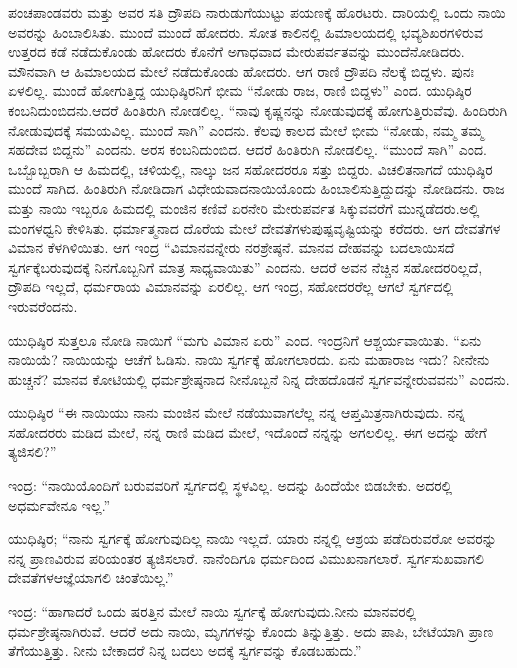 ಪಂಚಪಾಂಡವರು ಮತ್ತು ಅವರ ಸತಿ ದ್ರೌಪದಿ ನಾರುಡುಗೆಯುಟ್ಟು ಪಯಣಕ್ಕೆ ಹೊರಟರು. ದಾರಿಯಲ್ಲಿ ಒಂದು ನಾಯಿ ಅವರನ್ನು ಹಿಂಬಾಲಿಸಿತು. ಮುಂದೆ ಮುಂದೆ ಹೋದರು. ಸೋತ ಕಾಲಿನಲ್ಲಿ ಹಿಮಾಲಯದಲ್ಲಿ ಭವ್ಯಶಿಖರಗಳಿರುವ ಉತ್ತರದ ಕಡೆ ನಡೆದುಕೊಂಡು ಹೋದರು ಕೊನೆಗೆ ಅಗಾಧವಾದ ಮೇರುಪರ್ವತವನ್ನು ಮುಂದೆ\break ನೋಡಿದರು. ಮೌನವಾಗಿ ಆ ಹಿಮಾಲಯದ ಮೇಲೆ ನಡೆದುಕೊಂಡು ಹೋದರು. ಆಗ ರಾಣಿ ದ್ರೌಪದಿ ನೆಲಕ್ಕೆ ಬಿದ್ದಳು. ಪುನಃ ಏಳಲಿಲ್ಲ. ಮುಂದೆ ಹೋಗುತ್ತಿದ್ದ ಯುಧಿಷ್ಠಿರನಿಗೆ ಭೀಮ “ನೋಡು ರಾಜ, ರಾಣಿ ಬಿದ್ದಳು” ಎಂದ. ಯುಧಿಷ್ಠಿರ ಕಂಬನಿದುಂಬಿದನು.\break ಆದರೆ ಹಿಂತಿರುಗಿ ನೋಡಲಿಲ್ಲ. “ನಾವು ಕೃಷ್ಣನನ್ನು ನೋಡುವುದಕ್ಕೆ ಹೋಗುತ್ತಿರುವೆವು. ಹಿಂದಿರುಗಿ ನೋಡುವುದಕ್ಕೆ ಸಮಯವಿಲ್ಲ. ಮುಂದೆ ಸಾಗಿ” ಎಂದನು. ಕೆಲವು ಕಾಲದ ಮೇಲೆ ಭೀಮ “ನೋಡು, ನಮ್ಮ ತಮ್ಮ ಸಹದೇವ ಬಿದ್ದನು” ಎಂದನು. ಅರಸ ಕಂಬನಿದುಂಬಿದ. ಆದರೆ ಹಿಂತಿರುಗಿ ನೋಡಲಿಲ್ಲ. “ಮುಂದೆ ಸಾಗಿ” ಎಂದ. ಒಬ್ಬೊಬ್ಬರಾಗಿ ಆ ಹಿಮದಲ್ಲಿ, ಚಳಿಯಲ್ಲಿ, ನಾಲ್ಕು ಜನ ಸಹೋದರರೂ ಸತ್ತು ಬಿದ್ದರು. ವಿಚಲಿತನಾಗದೆ ಯುಧಿಷ್ಠಿರ ಮುಂದೆ ಸಾಗಿದ. ಹಿಂತಿರುಗಿ ನೋಡಿದಾಗ ವಿಧೇಯವಾದ\break ನಾಯಿಯೊಂದು ಹಿಂಬಾಲಿಸುತ್ತಿದ್ದುದನ್ನು ನೋಡಿದನು. ರಾಜ ಮತ್ತು ನಾಯಿ ಇಬ್ಬರೂ ಹಿಮದಲ್ಲಿ ಮಂಜಿನ ಕಣಿವೆ ಏರನೇರಿ ಮೇರುಪರ್ವತ ಸಿಕ್ಕುವವರೆಗೆ ಮುನ್ನಡೆದರು.\break ಅಲ್ಲಿ ಮಂಗಳಧ್ವನಿ ಕೇಳಿಸಿತು. ಧರ್ಮಾತ್ಮನಾದ ದೊರೆಯ ಮೇಲೆ ದೇವತೆಗಳು\break ಪುಷ್ಪವೃಷ್ಟಿಯನ್ನು ಕರೆದರು. ಆಗ ದೇವತೆಗಳ ವಿಮಾನ ಕೆಳಗಿಳಿಯಿತು. ಆಗ ಇಂದ್ರ “ವಿಮಾನವನ್ನೇರು ನರಶ್ರೇಷ್ಠನೆ. ಮಾನವ ದೇಹವನ್ನು ಬದಲಾಯಿಸದೆ ಸ್ವರ್ಗಕ್ಕೆ\break ಬರುವುದಕ್ಕೆ ನಿನಗೊಬ್ಬನಿಗೆ ಮಾತ್ರ ಸಾಧ್ಯವಾಯಿತು” ಎಂದನು. ಆದರೆ ಅವನ ನೆಚ್ಚಿನ ಸಹೋದರರಿಲ್ಲದೆ, ದ್ರೌಪದಿ ಇಲ್ಲದೆ, ಧರ್ಮರಾಯ ವಿಮಾನವನ್ನು ಏರಲಿಲ್ಲ. ಆಗ ಇಂದ್ರ, ಸಹೋದರರೆಲ್ಲ ಆಗಲೆ ಸ್ವರ್ಗದಲ್ಲಿ ಇರುವರೆಂದನು.

ಯುಧಿಷ್ಠಿರ ಸುತ್ತಲೂ ನೋಡಿ ನಾಯಿಗೆ “ಮಗು ವಿಮಾನ ಏರು” ಎಂದ. ಇಂದ್ರನಿಗೆ ಆಶ್ಚರ್ಯವಾಯಿತು. “ಏನು ನಾಯಿಯೆ? ನಾಯಿಯನ್ನು ಆಚೆಗೆ ಓಡಿಸು. ನಾಯಿ ಸ್ವರ್ಗಕ್ಕೆ ಹೋಗಲಾರದು. ಏನು ಮಹಾರಾಜ ಇದು? ನೀನೇನು ಹುಚ್ಚನೆ? ಮಾನವ ಕೋಟಿಯಲ್ಲಿ ಧರ್ಮಶ್ರೇಷ್ಠನಾದ ನೀನೊಬ್ಬನೆ ನಿನ್ನ ದೇಹದೊಡನೆ ಸ್ವರ್ಗವನ್ನೇರುವವನು” ಎಂದನು.

\vskip 0.1cm

ಯುಧಿಷ್ಠಿರ “ಈ ನಾಯಿಯು ನಾನು ಮಂಜಿನ ಮೇಲೆ ನಡೆಯುವಾಗಲೆಲ್ಲ ನನ್ನ ಆಪ್ತಮಿತ್ರನಾಗಿರುವುದು. ನನ್ನ ಸಹೋದರರು ಮಡಿದ ಮೇಲೆ, ನನ್ನ ರಾಣಿ ಮಡಿದ ಮೇಲೆ, ಇದೊಂದೆ ನನ್ನನ್ನು ಅಗಲಲಿಲ್ಲ. ಈಗ ಅದನ್ನು ಹೇಗೆ ತ್ಯಜಿಸಲಿ?”

\vskip 0.1cm

ಇಂದ್ರ: “ನಾಯಿಯೊಂದಿಗೆ ಬರುವವರಿಗೆ ಸ್ವರ್ಗದಲ್ಲಿ ಸ್ಥಳವಿಲ್ಲ. ಅದನ್ನು ಹಿಂದೆಯೇ ಬಿಡಬೇಕು. ಅದರಲ್ಲಿ ಅಧರ್ಮವೇನೂ ಇಲ್ಲ.”

\vskip 0.1cm

ಯುಧಿಷ್ಠಿರ; “ನಾನು ಸ್ವರ್ಗಕ್ಕೆ ಹೋಗುವುದಿಲ್ಲ ನಾಯಿ ಇಲ್ಲದೆ. ಯಾರು ನನ್ನಲ್ಲಿ ಆಶ್ರಯ ಪಡೆದಿರುವರೋ ಅವರನ್ನು ನನ್ನ ಪ್ರಾಣವಿರುವ ಪರಿಯಂತರ ತ್ಯಜಿಸಲಾರೆ. ನಾನೆಂದಿಗೂ ಧರ್ಮದಿಂದ ವಿಮುಖನಾಗಲಾರೆ. ಸ್ವರ್ಗಸುಖವಾಗಲಿ ದೇವತೆಗಳ\break ಆಜ್ಞೆಯಾಗಲಿ ಚಿಂತೆಯಿಲ್ಲ.”

\vskip 0.1cm

ಇಂದ್ರ: “ಹಾಗಾದರೆ ಒಂದು ಷರತ್ತಿನ ಮೇಲೆ ನಾಯಿ ಸ್ವರ್ಗಕ್ಕೆ ಹೋಗುವುದು.\break ನೀನು ಮಾನವರಲ್ಲಿ ಧರ್ಮಶ್ರೇಷ್ಠನಾಗಿರುವೆ. ಆದರೆ ಅದು ನಾಯಿ, ಮೃಗಗಳನ್ನು ಕೊಂದು ತಿನ್ನುತ್ತಿತ್ತು. ಅದು ಪಾಪಿ, ಬೇಟೆಯಾಗಿ ಪ್ರಾಣ ತೆಗೆಯುತ್ತಿತ್ತು. ನೀನು ಬೇಕಾದರೆ ನಿನ್ನ ಬದಲು ಅದಕ್ಕೆ ಸ್ವರ್ಗವನ್ನು ಕೊಡಬಹುದು.”

